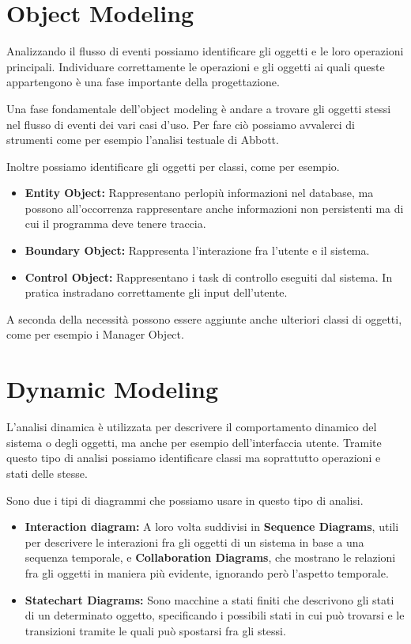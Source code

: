 \section{Object Modeling}
    Analizzando il flusso di eventi possiamo identificare gli oggetti e le loro operazioni principali. Individuare correttamente le operazioni e gli oggetti ai quali queste appartengono è una fase importante della progettazione.
    
    Una fase fondamentale dell'object modeling è andare a trovare gli oggetti stessi nel flusso di eventi dei vari casi d'uso. Per fare ciò possiamo avvalerci di strumenti come per esempio l'analisi testuale di Abbott.
    
    Inoltre possiamo identificare gli oggetti per classi, come per esempio.
    
    \begin{itemize}
        \item \textbf{Entity Object:} Rappresentano perlopiù informazioni nel database, ma possono all'occorrenza rappresentare anche informazioni non persistenti ma di cui il programma deve tenere traccia.
        \item \textbf{Boundary Object:} Rappresenta l'interazione fra l'utente e il sistema.
        \item \textbf{Control Object:} Rappresentano i task di controllo eseguiti dal sistema. In pratica instradano correttamente gli input dell'utente.
    \end{itemize}
    
    A seconda della necessità possono essere aggiunte anche ulteriori classi di oggetti, come per esempio i Manager Object.
    
\section{Dynamic Modeling}
    L'analisi dinamica è utilizzata per descrivere il comportamento dinamico del sistema o degli oggetti, ma anche per esempio dell'interfaccia utente. Tramite questo tipo di analisi possiamo identificare classi ma soprattutto operazioni e stati delle stesse.
    
    Sono due i tipi di diagrammi che possiamo usare in questo tipo di analisi.
    
    \begin{itemize}
        \item \textbf{Interaction diagram:} A loro volta suddivisi in \textbf{Sequence Diagrams}, utili per descrivere le interazioni fra gli oggetti di un sistema in base a una sequenza temporale, e \textbf{Collaboration Diagrams}, che mostrano le relazioni fra gli oggetti in maniera più evidente, ignorando però l'aspetto temporale.
        \item \textbf{Statechart Diagrams:} Sono macchine a stati finiti che descrivono gli stati di un determinato oggetto, specificando i possibili stati in cui può trovarsi e le transizioni tramite le quali può spostarsi fra gli stessi.
    \end{itemize}
    
